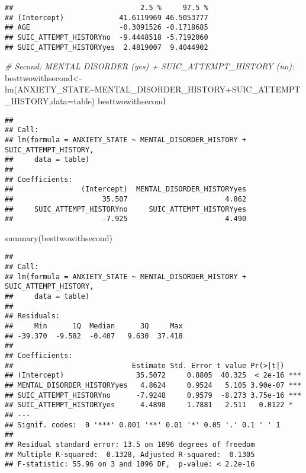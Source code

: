 \documentclass[
]{book}
\newenvironment{Shaded}{\begin{snugshade}}{\end{snugshade}}
\newcommand{\AttributeTok}[1]{\textcolor[rgb]{0.77,0.63,0.00}{#1}}
\newcommand{\CommentTok}[1]{\textcolor[rgb]{0.56,0.35,0.01}{\textit{#1}}}
\newcommand{\FunctionTok}[1]{\textcolor[rgb]{0.00,0.00,0.00}{#1}}
\newcommand{\NormalTok}[1]{#1}
\newcommand{\OtherTok}[1]{\textcolor[rgb]{0.56,0.35,0.01}{#1}}
\newcommand{\SpecialCharTok}[1]{\textcolor[rgb]{0.00,0.00,0.00}{#1}}
\begin{document}
\begin{verbatim}
##                              2.5 %     97.5 %
## (Intercept)             41.6119969 46.5053777
## AGE                     -0.3091526 -0.1718685
## SUIC_ATTEMPT_HISTORYno  -9.4448518 -5.7192060
## SUIC_ATTEMPT_HISTORYyes  2.4819007  9.4044902
\end{verbatim}

\begin{Shaded}
\begin{Highlighting}[]
\CommentTok{\# Second: MENTAL DISORDER (yes) + SUIC\_ATTEMPT\_HISTORY (no):}
\NormalTok{besttwowithsecond}\OtherTok{\textless{}{-}}\FunctionTok{lm}\NormalTok{(ANXIETY\_STATE}\SpecialCharTok{\textasciitilde{}}\NormalTok{MENTAL\_DISORDER\_HISTORY}\SpecialCharTok{+}\NormalTok{SUIC\_ATTEMPT\_HISTORY,}\AttributeTok{data=}\NormalTok{table)}
\NormalTok{besttwowithsecond}
\end{Highlighting}
\end{Shaded}

\begin{verbatim}
## 
## Call:
## lm(formula = ANXIETY_STATE ~ MENTAL_DISORDER_HISTORY + SUIC_ATTEMPT_HISTORY, 
##     data = table)
## 
## Coefficients:
##                (Intercept)  MENTAL_DISORDER_HISTORYyes  
##                     35.507                       4.862  
##     SUIC_ATTEMPT_HISTORYno     SUIC_ATTEMPT_HISTORYyes  
##                     -7.925                       4.490
\end{verbatim}

\begin{Shaded}
\begin{Highlighting}[]
\FunctionTok{summary}\NormalTok{(besttwowithsecond)}
\end{Highlighting}
\end{Shaded}

\begin{verbatim}
## 
## Call:
## lm(formula = ANXIETY_STATE ~ MENTAL_DISORDER_HISTORY + SUIC_ATTEMPT_HISTORY, 
##     data = table)
## 
## Residuals:
##     Min      1Q  Median      3Q     Max 
## -39.370  -9.582  -0.407   9.630  37.418 
## 
## Coefficients:
##                            Estimate Std. Error t value Pr(>|t|)    
## (Intercept)                 35.5072     0.8805  40.325  < 2e-16 ***
## MENTAL_DISORDER_HISTORYyes   4.8624     0.9524   5.105 3.90e-07 ***
## SUIC_ATTEMPT_HISTORYno      -7.9248     0.9579  -8.273 3.75e-16 ***
## SUIC_ATTEMPT_HISTORYyes      4.4898     1.7881   2.511   0.0122 *  
## ---
## Signif. codes:  0 '***' 0.001 '**' 0.01 '*' 0.05 '.' 0.1 ' ' 1
## 
## Residual standard error: 13.5 on 1096 degrees of freedom
## Multiple R-squared:  0.1328, Adjusted R-squared:  0.1305 
## F-statistic: 55.96 on 3 and 1096 DF,  p-value: < 2.2e-16
\end{verbatim}
\end{document}

